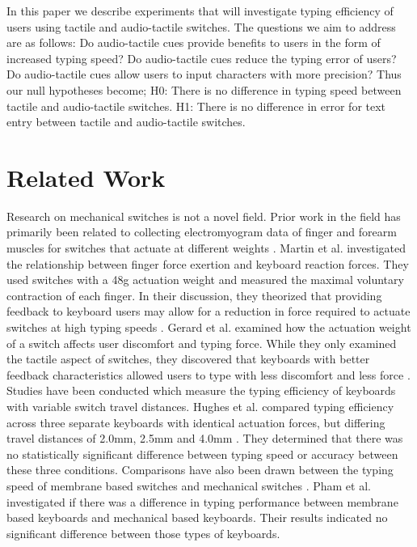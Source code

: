 \documentclass{sigchi}
\begin{document}
In this paper we describe experiments that will investigate typing efficiency of users using tactile and audio-tactile switches. The questions we aim to address are as follows: Do audio-tactile cues provide benefits to users in the form of increased typing speed? Do audio-tactile cues reduce the typing error of users? Do audio-tactile cues allow users to input characters with more precision? Thus our null hypotheses become; H0: There is no difference in typing speed between tactile and audio-tactile switches. H1: There is no difference in error for text entry between tactile and audio-tactile switches. \\

\section{Related Work}
Research on mechanical switches is not a novel field. Prior work in the field has primarily been related to collecting electromyogram data of finger and forearm muscles for switches that actuate at different weights \cite{martin:1996, rempel:1997, radwin:1999, gerard:1999}. Martin et al. investigated the relationship between finger force exertion and keyboard reaction forces. They used switches with a 48g actuation weight and measured the maximal voluntary contraction of each finger. In their discussion, they theorized that providing feedback to keyboard users may allow for a reduction in force required to actuate switches at high typing speeds \cite{martin:1996}. Gerard et al. examined how the actuation weight of a switch affects user discomfort and typing force. While they only examined the tactile aspect of switches, they discovered that keyboards with better feedback characteristics allowed users to type with less discomfort and less force \cite{gerard:1999}. \\

Studies have been conducted which measure the typing efficiency of keyboards with variable switch travel distances. Hughes et al. compared typing efficiency across three separate keyboards with identical actuation forces, but differing travel distances of 2.0mm, 2.5mm and 4.0mm \cite{hughes:2011}. They determined that there was no statistically significant difference between typing speed or accuracy between these three conditions. Comparisons have also been drawn between the typing speed of membrane based switches and mechanical switches \cite{pham:2015}. Pham et al. investigated if there was a difference in typing performance between membrane based keyboards and mechanical based keyboards. Their results indicated no significant difference between those types of keyboards.\\
\end{document}
